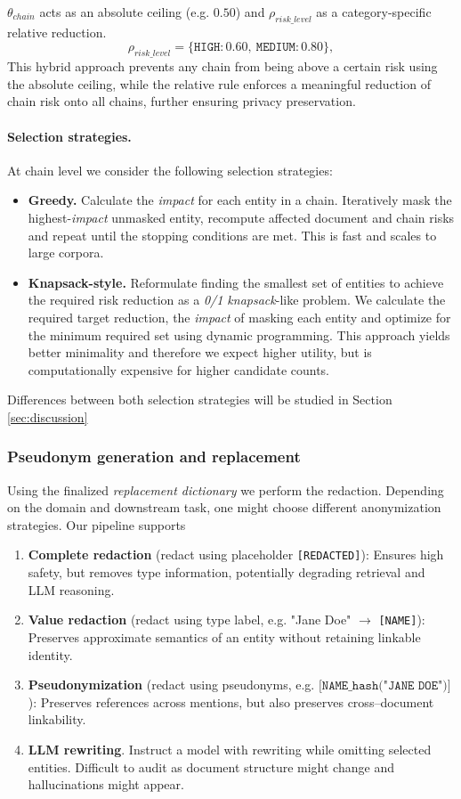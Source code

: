 $\theta_{chain}$ acts as an absolute ceiling (e.g. $0.50$) and $\rho_{risk\_level}$ as a category-specific relative reduction.
\[
    \rho_{risk\_level} = \{\texttt{HIGH}:0.60,\ \texttt{MEDIUM}:0.80\},
\]
This hybrid approach prevents any chain from being above a certain risk using the absolute ceiling, while the relative rule enforces a meaningful reduction of chain risk onto all chains, further ensuring privacy preservation.

\paragraph{Selection strategies.}
At chain level we consider the following selection strategies:
\begin{itemize}
    \item \textbf{Greedy.} Calculate the \textit{impact} for each entity in a chain. Iteratively mask the highest-\textit{impact} unmasked entity, recompute affected document and chain risks and repeat until the stopping conditions are met. This is fast and scales to large corpora.
    \item \textbf{Knapsack-style.} Reformulate finding the smallest set of entities to achieve the required risk reduction as a \textit{0/1 knapsack}-like problem. We calculate the required target reduction, the \textit{impact} of masking each entity and optimize for the minimum required set using dynamic programming. This approach yields better minimality and therefore we expect higher utility, but is computationally expensive for higher candidate counts.
\end{itemize}
Differences between both selection strategies will be studied in Section \ref{sec:discussion} %

\subsubsection{Pseudonym generation and replacement}
Using the finalized \textit{replacement dictionary} we perform the redaction. Depending on the domain and downstream task, one might choose different anonymization strategies. Our pipeline supports
\begin{enumerate}
    \item \textbf{Complete redaction} (redact using placeholder \texttt{[REDACTED]}): Ensures high safety, but removes type information, potentially degrading retrieval and LLM reasoning.
    \item \textbf{Value redaction} (redact using type label, e.g. "Jane Doe" $\rightarrow$ \texttt{[NAME]}): Preserves approximate semantics of an entity without retaining linkable identity.
    \item \textbf{Pseudonymization} (redact using pseudonyms, e.g. $\texttt{[NAME\_{hash}("JANE DOE")]}$): Preserves references across mentions, but also preserves cross–document linkability.
    \item \textbf{LLM rewriting}. Instruct a model with rewriting while omitting selected entities. Difficult to audit as document structure might change and hallucinations might appear.
\end{enumerate}

